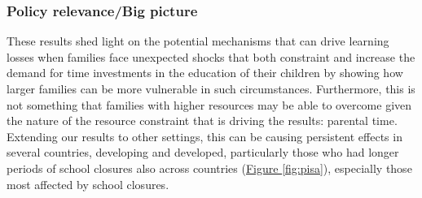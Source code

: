 

\subsubsection{Policy relevance/Big picture}

These results shed light on the potential mechanisms that can drive learning losses when families face unexpected shocks that both constraint and increase the demand for time investments in the education of their children by showing how larger families can be more vulnerable in such circumstances. Furthermore, this is not something that families with higher resources may be able to overcome given the nature of the resource constraint that is driving the results: parental time. Extending our results to other settings, this can be causing persistent effects in several countries, developing and developed, particularly those who had longer periods of school closures also across countries (\hyperref[fig:pisa]{Figure \ref{fig:pisa}}), especially those most affected by school closures.

